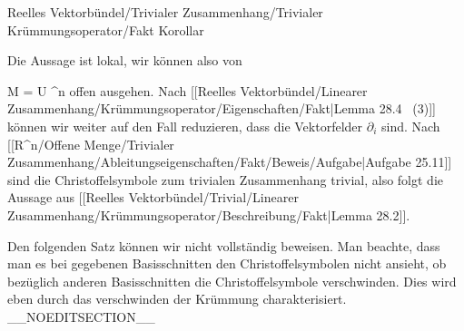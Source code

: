 {Reelles Vektorbündel/Trivialer Zusammenhang/Trivialer Krümmungsoperator/Fakt}
{Korollar}
{}
{

\faktzusatz {}
\faktzusatz {}

}
{

Die Aussage ist lokal, wir können also von

\mavergleichskette
{\vergleichskette
{ M
}
{ = }{ U
}
{ \subseteq }{ \R^n
}
{    }{
}
{   }{
}
}
{}{}{}
offen ausgehen. Nach
[[Reelles Vektorbündel/Linearer Zusammenhang/Krümmungsoperator/Eigenschaften/Fakt|Lemma 28.4  (3)]]
können wir weiter auf den Fall reduzieren, dass die Vektorfelder
$\partial_i$ sind. Nach
[[R^n/Offene Menge/Trivialer Zusammenhang/Ableitungseigenschaften/Fakt/Beweis/Aufgabe|Aufgabe 25.11]]
sind die Christoffelsymbole zum trivialen Zusammenhang trivial, also folgt die Aussage aus
[[Reelles Vektorbündel/Trivial/Linearer Zusammenhang/Krümmungsoperator/Beschreibung/Fakt|Lemma 28.2]].

}


Den folgenden Satz können wir nicht vollständig beweisen. Man beachte, dass man es bei
 {} {}
gegebenen Basisschnitten den Christoffelsymbolen nicht ansieht, ob bezüglich anderen Basisschnitten die Christoffelsymbole verschwinden. Dies wird eben durch das verschwinden der Krümmung charakterisiert.
__NOEDITSECTION__

